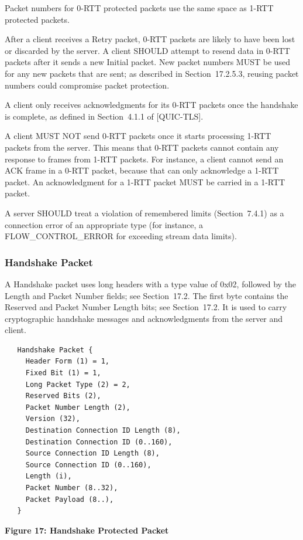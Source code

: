 \documentclass{article}
\begin{document}
Packet numbers for 0-RTT protected packets use the same space as 1-RTT protected packets.

After a client receives a Retry packet, 0-RTT packets are likely to have been lost or discarded by the server.  A client SHOULD attempt to resend data in 0-RTT packets after it sends a new Initial packet. New packet numbers MUST be used for any new packets that are sent; as described in Section~17.2.5.3, reusing packet numbers could compromise packet protection.

A client only receives acknowledgments for its 0-RTT packets once the handshake is complete, as defined in Section~4.1.1 of [QUIC-TLS].

A client MUST NOT send 0-RTT packets once it starts processing 1-RTT packets from the server.  This means that 0-RTT packets cannot contain any response to frames from 1-RTT packets.  For instance, a client cannot send an ACK frame in a 0-RTT packet, because that can only acknowledge a 1-RTT packet.  An acknowledgment for a 1-RTT packet MUST be carried in a 1-RTT packet.

A server SHOULD treat a violation of remembered limits (Section~7.4.1) as a connection error of an appropriate type (for instance, a FLOW\_CONTROL\_ERROR for exceeding stream data limits).

\subsubsection{Handshake Packet}

A Handshake packet uses long headers with a type value of 0x02, followed by the Length and Packet Number fields; see Section~17.2. The first byte contains the Reserved and Packet Number Length bits; see Section~17.2.  It is used to carry cryptographic handshake messages and acknowledgments from the server and client.

\begin{verbatim}
   Handshake Packet {
     Header Form (1) = 1,
     Fixed Bit (1) = 1,
     Long Packet Type (2) = 2,
     Reserved Bits (2),
     Packet Number Length (2),
     Version (32),
     Destination Connection ID Length (8),
     Destination Connection ID (0..160),
     Source Connection ID Length (8),
     Source Connection ID (0..160),
     Length (i),
     Packet Number (8..32),
     Packet Payload (8..),
   }
\end{verbatim}

\begin{center}
\textbf{Figure 17: Handshake Protected Packet}
\end{center}
\end{document}
